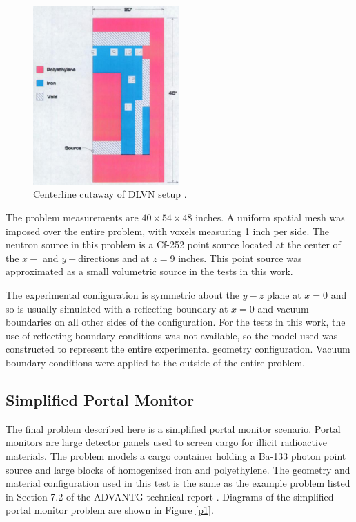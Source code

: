 \documentclass{article} %
\begin{document}
\begin{figure}[!htb]
\centering
\includegraphics[width=0.5\textwidth]{img/dlvn.png}
\caption{Centerline cutaway of DLVN setup \cite{sw-dlvn}.}
\label{dlvn}
\end{figure}

The problem measurements are $40\times54\times48$ inches. A uniform spatial
mesh was imposed over the entire problem, with voxels measuring 1 inch per
side. The neutron source in this problem is a Cf-252 point source located at
the center of the $x-$ and $y-$directions and at $z = 9$ inches. This point
source was approximated as a small volumetric source in the tests in this
work.

The experimental configuration is symmetric about the $y-z$ plane at $x = 0$
and so is usually simulated with a reflecting boundary at $x = 0$ and vacuum
boundaries on all other sides of the configuration. For the tests in this work,
the use of reflecting boundary conditions was not available, so the model used 
was constructed to represent the entire experimental geometry configuration.
Vacuum boundary conditions were applied to the outside of the entire problem.

\subsection{Simplified Portal Monitor}

The final problem described here is a simplified portal monitor scenario.
Portal monitors are large detector panels used to screen cargo for illicit
radioactive materials. The problem models a cargo container holding a Ba-133
photon point source and large blocks of homogenized iron and polyethylene. 
The geometry and material configuration used in this test is the same as the
example problem listed in Section 7.2 of the ADVANTG technical report
\cite{advantg}. Diagrams of the simplified portal monitor problem are shown in
Figure \ref{p1}.
\end{document}
